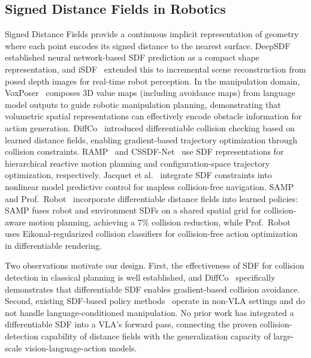 \subsection{Signed Distance Fields in Robotics}

Signed Distance Fields provide a continuous implicit representation of geometry where each point encodes its signed distance to the nearest surface. DeepSDF~\cite{park2019deepsdf} established neural network-based SDF prediction as a compact shape representation, and iSDF~\cite{ortiz2022isdf} extended this to incremental scene reconstruction from posed depth images for real-time robot perception. In the manipulation domain, VoxPoser~\cite{huang2023voxposer} composes 3D value maps (including avoidance maps) from language model outputs to guide robotic manipulation planning, demonstrating that volumetric spatial representations can effectively encode obstacle information for action generation. DiffCo~\cite{zhi2021diffco} introduced differentiable collision checking based on learned distance fields, enabling gradient-based trajectory optimization through collision constraints. RAMP~\cite{vasilopoulos2023ramp} and CSSDF-Net~\cite{chen2026cssdfnet} use SDF representations for hierarchical reactive motion planning and configuration-space trajectory optimization, respectively. Jacquet et al.~\cite{jacquet2025neuralnmpc} integrate SDF constraints into nonlinear model predictive control for mapless collision-free navigation. SAMP~\cite{chen2025samp} and Prof.\ Robot~\cite{ruan2025profrobot} incorporate differentiable distance fields into learned policies: SAMP fuses robot and environment SDFs on a shared spatial grid for collision-aware motion planning, achieving a 7\% collision reduction, while Prof.\ Robot uses Eikonal-regularized collision classifiers for collision-free action optimization in differentiable rendering.

Two observations motivate our design. First, the effectiveness of SDF for collision detection in classical planning is well established, and DiffCo~\cite{zhi2021diffco} specifically demonstrates that differentiable SDF enables gradient-based collision avoidance. Second, existing SDF-based policy methods~\cite{chen2025samp,ruan2025profrobot} operate in non-VLA settings and do not handle language-conditioned manipulation. No prior work has integrated a differentiable SDF into a VLA's forward pass, connecting the proven collision-detection capability of distance fields with the generalization capacity of large-scale vision-language-action models.


